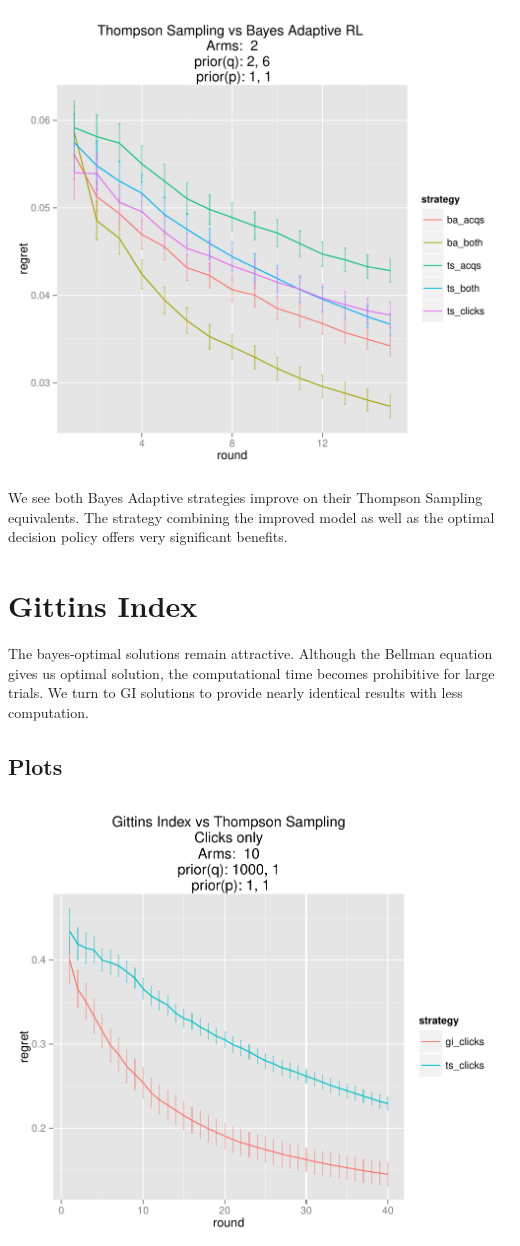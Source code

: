 \documentclass[11pt,a4,singlespacing,titlepagenumber=on]{scrreprt}
\numberwithin{equation}{chapter} %
\theoremstyle{remark}
\begin{document}
\includegraphics[scale=0.9]{TSvsBARL.pdf}

We see both Bayes Adaptive strategies improve on their Thompson Sampling equivalents. The strategy combining the improved model as well as the optimal decision policy offers very significant benefits.


\section{Gittins Index}

The bayes-optimal solutions remain attractive. Although the Bellman equation gives us optimal solution, the computational time becomes prohibitive for large trials. We turn to GI solutions to provide nearly identical results with less computation.

\subsection{Plots}

\includegraphics[scale=0.7]{GIvsTS.pdf}
\end{document}
